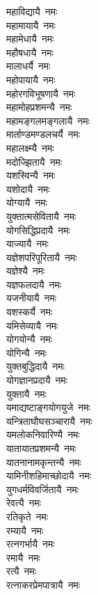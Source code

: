 \begin{multicols}{\maxColumns}
\begin{flushleft}
महाविद्यायै~नमः\\
महामायायै~नमः\\
महामेधायै~नमः\\
महौषधायै~नमः\\
मालाधर्यै~नमः\hfill{}\\
महोपायायै~नमः\\
महोरगविभूषणायै~नमः\\
महामोहप्रशमन्यै~नमः\\
महामङ्गलमङ्गलायै~नमः\\
मार्ताण्डमण्डलचर्यै~नमः\\
महालक्ष्म्यै~नमः\\
मदोज्झितायै~नमः\\
यशस्विन्यै~नमः\\
यशोदायै~नमः\\
योग्यायै~नमः\hfill{}\\
युक्तात्मसेवितायै~नमः\\
योगसिद्धिप्रदायै~नमः\\
याज्यायै~नमः\\
यज्ञेशपरिपूरितायै~नमः\\
यज्ञेश्यै~नमः\\
यज्ञफलदायै~नमः\\
यजनीयायै~नमः\\
यशस्कर्यै~नमः\\
यमिसेव्यायै~नमः\\
योगयोन्यै~नमः\hfill{}\\
योगिन्यै~नमः\\
युक्तबुद्धिदायै~नमः\\
योगज्ञानप्रदायै~नमः\\
युक्तायै~नमः\\
यमाद्यष्टाङ्गयोगयुजे~नमः\\
यन्त्रिताघौघसञ्चारायै~नमः\\
यमलोकनिवारिण्यै~नमः\\
यातायातप्रशमन्यै~नमः\\
यातनानामकृन्तन्यै~नमः\\
यामिनीशहिमाच्छोदायै~नमः\hfill{}\\
युगधर्मविवर्जितायै~नमः\\
रेवत्यै~नमः\\
रतिकृते~नमः\\
रम्यायै~नमः\\
रत्नगर्भायै~नमः\\
रमायै~नमः\\
रत्यै~नमः\\
रत्नाकरप्रेमपात्रायै~नमः\\

\end{flushleft}
\end{multicols}
